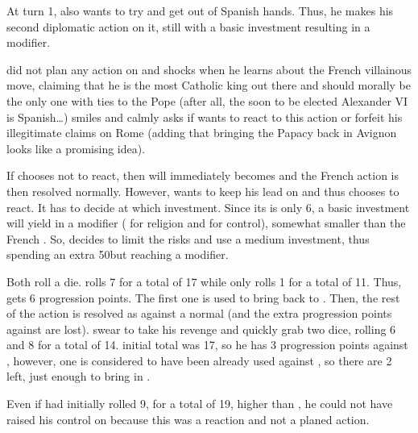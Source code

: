 \begin{exemple}[A reaction]
  At turn 1, \FRA also wants to try and get \paysPapaute out of Spanish
  hands. Thus, he makes his second diplomatic action on it, still with a basic
  investment resulting in a  modifier.

  \HIS did not plan any action on \paysPapaute and shocks when he learns about
  the French villainous move, claiming that he is the most Catholic king out
  there and should morally be the only one with ties to the Pope (after all,
  the soon to be elected Alexander VI is Spanish\ldots) \FRA smiles and calmly
  asks if \HIS wants to react to this action or forfeit his illegitimate
  claims on Rome (adding that bringing the Papacy back in Avignon looks like a
  promising idea).

  If \HIS chooses not to react, then \paysPapaute will immediately becomes
  \Neutral and the French action is then resolved normally. However, \HIS
  wants to keep his lead on \paysPapaute and thus chooses to react. It has to
  decide at which investment. Since its \DIP is only 6, a basic investment
  will yield in a  modifier ( for religion and 
  for control), somewhat smaller than the French . So, \HIS decides
  to limit the risks and use a medium investment, thus spending an extra
  50\ducats but reaching a  modifier.

  Both roll a die. \FRA rolls 7 for a total of 17 while \HIS only rolls 1 for
  a total of 11. Thus, \FRA gets 6 progression points. The first one is used
  to bring \paysPapaute back to \Neutral. Then, the rest of the action is
  resolved as against a normal \Neutral (and the extra progression points
  against \HIS are lost). \HIS swear to take his revenge and quickly grab two
  dice, rolling 6 and 8 for a total of 14. \FRA initial total was 17, so he
  has 3 progression points against \paysPapaute, however, one is considered to
  have been already used against \HIS, so there are 2 left, just enough to
  bring \paysPapaute in \SUB.

  \smallskip

  Even if \HIS had initially rolled 9, for a total of 19, higher than \FRA, he
  could not have raised his control on \paysPapaute because this was a
  reaction and not a planed action.
\end{exemple}

